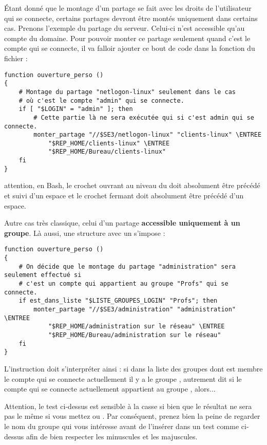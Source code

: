 Étant donné que le montage d'un partage se fait
avec les droits de l'utilisateur qui se connecte, certains partages
devront être montés uniquement dans certains cas.
Prenons l'exemple du partage 
du serveur. Celui-ci n'est accessible qu'au compte  du
domaine. Pour pouvoir monter ce partage seulement quand c'est
le compte  qui se connecte, il va falloir
ajouter ce bout de code dans la fonction
 du fichier  :
%
\begin{lstlisting}[emph={ENTREE},emphstyle={\return}]
function ouverture_perso ()
{
    # Montage du partage "netlogon-linux" seulement dans le cas 
    # où c'est le compte "admin" qui se connecte.
    if [ "$LOGIN" = "admin" ]; then
        # Cette partie là ne sera exécutée qui si c'est admin qui se connecte.
        monter_partage "//$SE3/netlogon-linux" "clients-linux" \ENTREE
            "$REP_HOME/clients-linux" \ENTREE
            "$REP_HOME/Bureau/clients-linux"
    fi
}
\end{lstlisting}
%
\begin{RQ}
attention, en Bash, le crochet ouvrant au niveau du  doit
absolument être précédé et suivi d'un espace et le crochet fermant doit
absolument être précédé d'un espace.
\end{RQ}
%
Autre cas très classique, celui d'un partage \textbf{accessible uniquement à
un groupe}. Là aussi, une structure avec un  s'impose :
%
\begin{lstlisting}[emph={ENTREE},emphstyle={\return}]
function ouverture_perso ()
{
    # On décide que le montage du partage "administration" sera seulement effectué si
    # c'est un compte qui appartient au groupe "Profs" qui se connecte.
    if est_dans_liste "$LISTE_GROUPES_LOGIN" "Profs"; then
        monter_partage "//$SE3/administration" "administration" \ENTREE
            "$REP_HOME/administration sur le réseau" \ENTREE
            "$REP_HOME/Bureau/administration sur le réseau"
    fi
}
\end{lstlisting}
%
L'instruction \og {} \fg{}
doit s'interpréter ainsi : \og si dans la liste des groupes dont est membre le compte qui
se connecte actuellement il y a le groupe , autrement dit si
le compte qui se connecte actuellement appartient au groupe ,
alors... \fg{}

\begin{alerte}
Attention, le test  ci-dessus est sensible à la casse
si bien que le résultat ne sera pas le même si vous mettez 
ou . Par conséquent, prenez bien la peine de regarder
le nom du groupe qui vous intéresse avant de l'insérer dans un test 
comme ci-dessus afin de bien respecter les minuscules et les majuscules.
\end{alerte}

